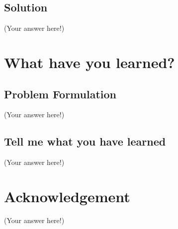 \documentclass[12pt,a4paper]{article}
\theoremstyle{definition}
\begin{document}
\subsection{Solution}
(Your answer here!)

\section{What have you learned?}
\subsection{Problem Formulation}
(Your answer here!)

\subsection{Tell me what you have learned}
(Your answer here!)

\section{Acknowledgement}
(Your answer here!)




\end{document}
